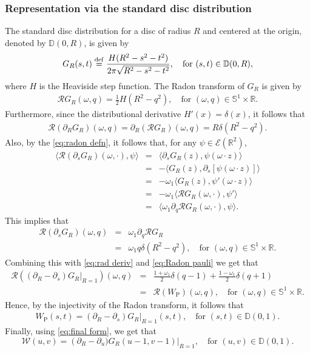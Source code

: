 \documentclass[11pt,reqno]{amsart}
\theoremstyle{plain}
\theoremstyle{definition}
\numberwithin{equation}{section}
\newcommand{\R}{\mathbb{R}}
\newcommand{\ltt}{\left(}
\newcommand{\rtt}{\right)}
\newcommand{\beas}{\begin{eqnarray*}}
\newcommand{\eeas}{\end{eqnarray*}}
\newcommand{\bea} {\begin{eqnarray}}
\newcommand{\eea} {\end{eqnarray}}
\newcommand{\bydef}{\stackrel{\rm def}{=}}
\begin{document}
\subsubsection{Representation via the standard disc distribution} 
The standard disc distribution for a disc of radius $R$ and centered at the origin, denoted by $\mathbb D(0,R)$, is given by
\beas
G_R(s,t) \bydef \frac{H(R^2 - s^2 - t^2)}{2\pi\sqrt{R^2 - s^2 - t^2}},\quad \text{for } (s,t)\in \mathbb D(0,R),
\eeas
where $H$ is the Heaviside step function.
The Radon transform of $G_R$ is given by
\beas
\mathcal{R}G_R(\omega,q) = \frac{1}{2}H(R^2 - q^2), \quad \text{for }(\omega,q)\in\mathbb S^{1}\times \R.
\eeas
Furthermore, since the distributional derivative $H'(x)=\delta(x)$, it follows that
\bea\label{eq:rad deriv}
\mathcal R\ltt \partial_R G_R\rtt(\omega,q)=\partial_R\ltt \mathcal{R}G_R\rtt (\omega,q)= R\delta(R^2-q^2).
\eea
Also, by the \eqref{eq:radon defn}, it follows that, for any $\psi\in\mathcal E(\R^2)$,
\beas
\langle \mathcal{R}(\partial_s G_R)(\omega, \cdot), \psi \rangle &=& \langle \partial_s G_R(z), \psi(\omega \cdot z) \rangle\\
&=&- \langle G_R(z), \partial_s [\psi(\omega \cdot z)] \rangle\\
&=&- \omega_1 \langle G_R(z), \psi'(\omega \cdot z) \rangle\\
&=& - \omega_1 \langle \mathcal{R}G_R(\omega, \cdot), \psi' \rangle\\
&=& \langle \omega_1 \partial_q \mathcal{R}G_R(\omega, \cdot), \psi \rangle.
\eeas
This implies that 
\beas
\mathcal{R}(\partial_s G_R)(\omega,q) &=& \omega_1 \partial_q \mathcal{R}G_R\\
&=&  \omega_1 q \delta(R^2-q^2), \quad \text{for }(\omega,q)\in\mathbb S^{1}\times \R. 
\eeas
Combining this with \eqref{eq:rad deriv} and \eqref{eq:Radon pauli} we get that
\beas
\mathcal{R}\ltt(\partial_R-\partial_s) G_R|_{R=1}\rtt(\omega,q)&=&{\frac{1+\omega_1}{2}\delta(q-1) + \frac{1-\omega_1}{2}\delta(q+1)}\\
&=& \mathcal R(W_\mathrm P)(\omega,q),\quad \text{for }(\omega,q)\in\mathbb S^{1}\times \R.
\eeas
Hence, by the injectivity of the Radon transform, it follows that
\beas
W_\mathrm P(s,t)=(\partial_R-\partial_s) G_R|_{R=1}(s,t), \quad \text{for }(s,t)\in\mathbb D(0,1).
\eeas
Finally, using \eqref{eq:final form}, we get that
$$
\mathcal W(u,v) = \left(\partial_R - \partial_u) G_R(u-1, v-1) \right|_{R=1},\quad \text{for }(u,v)\in\mathbb D(0,1).
$$

\vspace{2mm}
\end{document}
